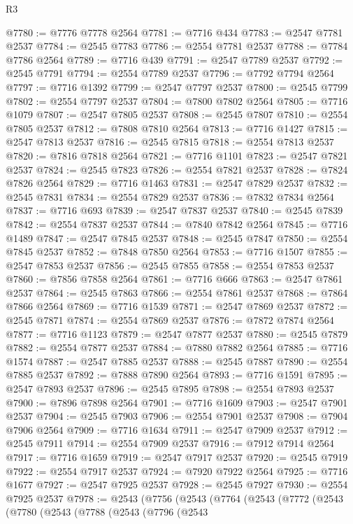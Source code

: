 \begin{lexlean}{R3}
\begin{coremodule}
@7780 := @7776 @7778 @2564
@7781 := @7716 @434
@7783 := @2547 @7781 @2537
@7784 := @2545 @7783
@7786 := @2554 @7781 @2537
@7788 := @7784 @7786 @2564
@7789 := @7716 @439
@7791 := @2547 @7789 @2537
@7792 := @2545 @7791
@7794 := @2554 @7789 @2537
@7796 := @7792 @7794 @2564
@7797 := @7716 @1392
@7799 := @2547 @7797 @2537
@7800 := @2545 @7799
@7802 := @2554 @7797 @2537
@7804 := @7800 @7802 @2564
@7805 := @7716 @1079
@7807 := @2547 @7805 @2537
@7808 := @2545 @7807
@7810 := @2554 @7805 @2537
@7812 := @7808 @7810 @2564
@7813 := @7716 @1427
@7815 := @2547 @7813 @2537
@7816 := @2545 @7815
@7818 := @2554 @7813 @2537
@7820 := @7816 @7818 @2564
@7821 := @7716 @1101
@7823 := @2547 @7821 @2537
@7824 := @2545 @7823
@7826 := @2554 @7821 @2537
@7828 := @7824 @7826 @2564
@7829 := @7716 @1463
@7831 := @2547 @7829 @2537
@7832 := @2545 @7831
@7834 := @2554 @7829 @2537
@7836 := @7832 @7834 @2564
@7837 := @7716 @693
@7839 := @2547 @7837 @2537
@7840 := @2545 @7839
@7842 := @2554 @7837 @2537
@7844 := @7840 @7842 @2564
@7845 := @7716 @1489
@7847 := @2547 @7845 @2537
@7848 := @2545 @7847
@7850 := @2554 @7845 @2537
@7852 := @7848 @7850 @2564
@7853 := @7716 @1507
@7855 := @2547 @7853 @2537
@7856 := @2545 @7855
@7858 := @2554 @7853 @2537
@7860 := @7856 @7858 @2564
@7861 := @7716 @666
@7863 := @2547 @7861 @2537
@7864 := @2545 @7863
@7866 := @2554 @7861 @2537
@7868 := @7864 @7866 @2564
@7869 := @7716 @1539
@7871 := @2547 @7869 @2537
@7872 := @2545 @7871
@7874 := @2554 @7869 @2537
@7876 := @7872 @7874 @2564
@7877 := @7716 @1123
@7879 := @2547 @7877 @2537
@7880 := @2545 @7879
@7882 := @2554 @7877 @2537
@7884 := @7880 @7882 @2564
@7885 := @7716 @1574
@7887 := @2547 @7885 @2537
@7888 := @2545 @7887
@7890 := @2554 @7885 @2537
@7892 := @7888 @7890 @2564
@7893 := @7716 @1591
@7895 := @2547 @7893 @2537
@7896 := @2545 @7895
@7898 := @2554 @7893 @2537
@7900 := @7896 @7898 @2564
@7901 := @7716 @1609
@7903 := @2547 @7901 @2537
@7904 := @2545 @7903
@7906 := @2554 @7901 @2537
@7908 := @7904 @7906 @2564
@7909 := @7716 @1634
@7911 := @2547 @7909 @2537
@7912 := @2545 @7911
@7914 := @2554 @7909 @2537
@7916 := @7912 @7914 @2564
@7917 := @7716 @1659
@7919 := @2547 @7917 @2537
@7920 := @2545 @7919
@7922 := @2554 @7917 @2537
@7924 := @7920 @7922 @2564
@7925 := @7716 @1677
@7927 := @2547 @7925 @2537
@7928 := @2545 @7927
@7930 := @2554 @7925 @2537
@7978 := @2543
    (@7756
      (@2543
        (@7764
          (@2543
            (@7772
              (@2543
                (@7780
                  (@2543
                    (@7788
                      (@2543
                        (@7796
                          (@2543

\end{coremodule}
\end{lexlean}
